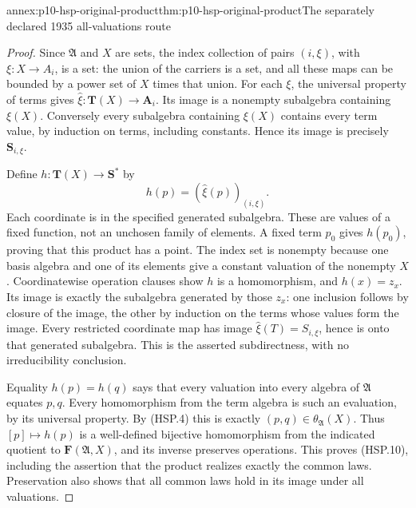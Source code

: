 \begin{annexitem}{annex:p10-hsp-original-product}{thm:p10-hsp-original-product}{The separately declared 1935 all-valuations route}
\begin{proof}
Since \(\mathfrak A\) and \(X\) are sets, the
index collection of pairs \((i,\xi)\), with
\(\xi:X\to A_i\), is a set: the union of the
carriers is a set, and all these maps can be
bounded by a power set of \(X\) times that union.
For each \(\xi\), the universal property of terms
gives \(\widehat\xi:\mathbf T(X)\to\mathbf A_i\).
Its image is a nonempty subalgebra containing
\(\xi(X)\). Conversely every subalgebra containing
\(\xi(X)\) contains every term value, by induction
on terms, including constants.
Hence its image is precisely \(\mathbf S_{i,\xi}\).

Define \(h:\mathbf T(X)\to\mathbf S^*\) by
\[
 h(p)=(\widehat\xi(p))_{(i,\xi)}.
 \]
Each coordinate is in the specified generated
subalgebra. These are values of a fixed function,
not an unchosen family of elements.
A fixed term \(p_0\) gives \(h(p_0)\), proving
that this product has a point.
The index set is nonempty because one basis
algebra and one of its elements give a constant
valuation of the nonempty \(X\).
Coordinatewise operation clauses show \(h\)
is a homomorphism, and \(h(x)=z_x\).
Its image is exactly the subalgebra generated
by those \(z_x\): one inclusion follows by
closure of the image, the other by induction
on the terms whose values form the image.
Every restricted coordinate map has image
\(\widehat\xi(T)=S_{i,\xi}\), hence is onto that
generated subalgebra. This is the asserted
subdirectness, with no irreducibility conclusion.

Equality \(h(p)=h(q)\) says that every valuation
into every algebra of \(\mathfrak A\) equates
\(p,q\). Every homomorphism from the term algebra
is such an evaluation, by its universal property.
By (HSP.4) this is exactly
\((p,q)\in\theta_{\mathfrak A}(X)\).
Thus \([p]\mapsto h(p)\) is a well-defined
bijective homomorphism from the indicated quotient
to \(\mathbf F(\mathfrak A,X)\), and its
inverse preserves operations.
This proves (HSP.10), including the assertion
that the product realizes exactly the common laws.
Preservation also shows that all common laws
hold in its image under all valuations.


\end{proof}
\end{annexitem}
